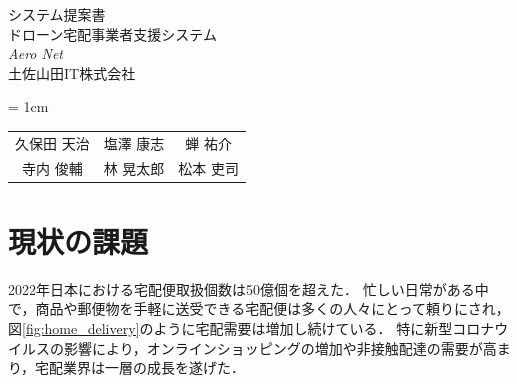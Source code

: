 \documentclass[a4paper, titlepage]{jsarticle}
\date{\today}
\newcommand{\system}{\textsl{Aero Net}}
\begin{document}
\begin{titlepage}
  \centering
  \vspace*{150truept}
  {\Large システム提案書}\\
  \vspace*{50truept}
  {\Huge ドローン宅配事業者支援システム} \\
  \vspace{15truept}
  {\Huge \system} \\
  \vspace{50truept}
  {\LARGE 土佐山田IT株式会社}\\
  \vspace{20truept}
  {\large{\tabcolsep = 1cm
      \begin{tabular}{ccc}
        久保田 天治 & 塩澤 康志 & 蝉 祐介  \\
        寺内 俊輔  & 林 晃太郎 & 松本 吏司
      \end{tabular}
    }}
\end{titlepage}

\tableofcontents

\clearpage

\section{現状の課題}
2022年日本における宅配便取扱個数は50億個を超えた．
忙しい日常がある中で，商品や郵便物を手軽に送受できる宅配便は多くの人々にとって頼りにされ，図\ref{fig:home_delivery}のように宅配需要は増加し続けている．
特に新型コロナウイルスの影響により，オンラインショッピングの増加や非接触配達の需要が高まり，宅配業界は一層の成長を遂げた．
\end{document}
